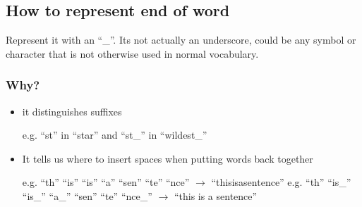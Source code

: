 \documentclass[11pt]{article}
\begin{document}
\begin{figure}[H]
    \centering
\end{figure}

\subsection{How to represent end of word}

Represent it with an ``\_''. Its not actually an underscore, could be any symbol or character that is not otherwise used in normal vocabulary. 

\subsubsection{Why?}

\begin{itemize}
    \item it distinguishes suffixes
    
    e.g. ``st'' in ``star'' and ``st\_'' in ``wildest\_''

    \item It tells us where to insert spaces when putting words back together
    
    e.g. ``th'' ``is'' ``is'' ``a'' ``sen'' ``te'' ``nce'' $\rightarrow$ ``thisisasentence''
    e.g. ``th'' ``is\_'' ``is\_'' ``a\_'' ``sen'' ``te'' ``nce\_'' $\rightarrow$ ``this is a sentence''
\end{itemize}
\end{document}
